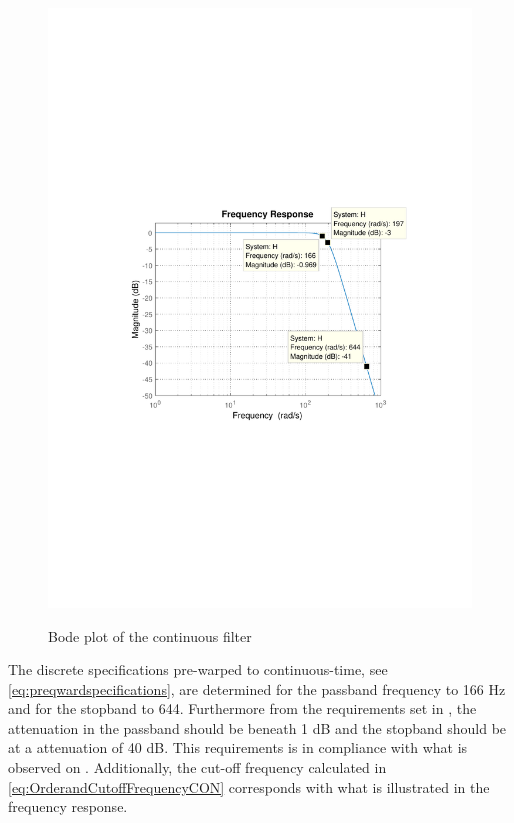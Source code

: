 \begin{figure}[H]
  \centering
  {
    \includegraphics[width=1.1\textwidth]{figures/ContinusFilterResponse.pdf}
  }
  \caption{Bode plot of the continuous filter}
  \label{fig:Continuoustimebodeplot}
\end{figure}
%
The discrete specifications pre-warped to continuous-time, see \eqref{eq:preqwardspecifications}, are determined for the passband frequency to 166 \si{Hz} and for the stopband to \si{644}. Furthermore from the requirements set in , the attenuation in the passband should be beneath 1 \si{dB} and the stopband should be at a attenuation of 40 \si{dB}. This requirements is in compliance with what is observed on . Additionally, the cut-off frequency calculated in \eqref{eq:OrderandCutoffFrequencyCON} corresponds with what is illustrated in the frequency response.

